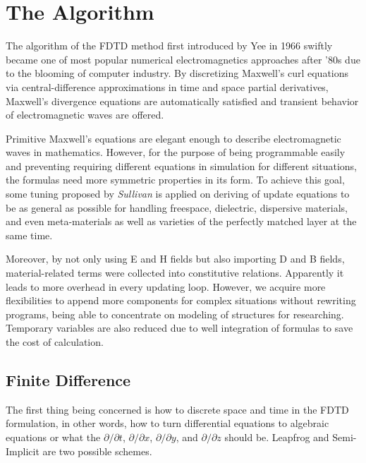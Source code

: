 \section{The Algorithm}
The algorithm of the FDTD method first introduced by Yee in 1966 swiftly became one of most popular numerical
electromagnetics approaches after '80s due to the blooming of computer industry. By discretizing Maxwell's curl
equations via central-difference approximations in time and space partial derivatives, Maxwell's divergence equations
are automatically satisfied and transient behavior of electromagnetic waves are offered.

Primitive Maxwell's equations are elegant enough to describe electromagnetic waves in mathematics. However, for the
purpose of being programmable easily and preventing requiring different equations in simulation for different
situations, the formulas need more symmetric properties in its form. To achieve this goal, some tuning proposed by
\textit{Sullivan} is applied on deriving of update equations to be as general as possible for handling freespace,
dielectric, dispersive materials, and even meta-materials as well as varieties of the perfectly matched layer at the
same time.

Moreover, by not only using E and H fields but also importing D and B fields, material-related terms were collected into
constitutive relations. Apparently it leads to more overhead in every updating loop. However, we acquire more
flexibilities to append more components for complex situations without rewriting programs, being able to concentrate on
modeling of structures for researching. Temporary variables are also reduced due to well integration of formulas to save
the cost of calculation.


\subsection{Finite Difference}
The first thing being concerned is how to discrete space and time in the FDTD formulation, in other words, how to turn
differential equations to algebraic equations or what the $\partial/\partial t$, $\partial/\partial x$,
$\partial/\partial y$, and $\partial/\partial z$ should be. Leapfrog and Semi-Implicit are two possible schemes.
